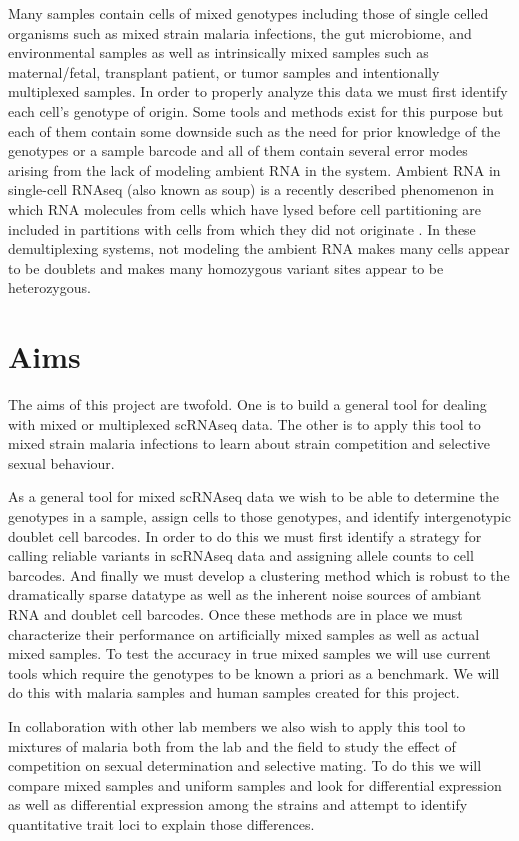 Many samples contain cells of mixed genotypes including those of single celled organisms such as mixed strain malaria infections, 
the gut microbiome, and environmental samples as well 
as intrinsically mixed samples such as maternal/fetal, transplant patient, or tumor samples and intentionally multiplexed samples. In order to properly 
analyze this data we must first identify each cell's genotype of origin. Some tools and methods exist for this purpose \cite{demuxlet} \cite{cellhashing} \cite{scsplit} 
but each of them contain some downside such as the need for prior knowledge of the genotypes or a sample barcode and all of them 
contain several error modes arising from the lack of modeling ambient RNA in the system. Ambient RNA in single-cell RNAseq (also known as soup) is a recently described 
phenomenon in which RNA molecules from cells which have lysed before cell partitioning are included in partitions with cells from which they did not originate \cite{soupx}. 
In these demultiplexing systems, not modeling the ambient RNA makes many cells appear to be doublets and makes many homozygous variant sites appear to be 
heterozygous.

\section{Aims}
The aims of this project are twofold. One is to build a general tool for dealing with mixed or multiplexed scRNAseq data. 
The other is to apply this tool to mixed strain malaria infections to learn about strain competition and selective sexual behaviour. 

As a general tool for mixed scRNAseq data we wish to be able to determine the genotypes in a sample, assign cells to those genotypes, and identify intergenotypic doublet cell barcodes.
In order to do this we must first identify a strategy for calling reliable variants in scRNAseq data and assigning allele counts to cell barcodes.
And finally we must develop a clustering method which is robust to the dramatically sparse datatype as well as the inherent noise sources of ambiant RNA and doublet cell barcodes.
Once these methods are in place we must characterize their performance on artificially mixed samples as well as actual mixed samples.
To test the accuracy in true mixed samples we will use current tools which require the genotypes to be known a priori as a benchmark.
We will do this with malaria samples and human samples created for this project. 

In collaboration with other lab members we also wish to 
apply this tool to mixtures of malaria both from the lab and the field to study the effect of competition on 
sexual determination and selective mating. To do this we will compare mixed samples and 
uniform samples and look for differential expression as well as differential expression among the strains 
and attempt to identify quantitative trait loci to explain those differences.

